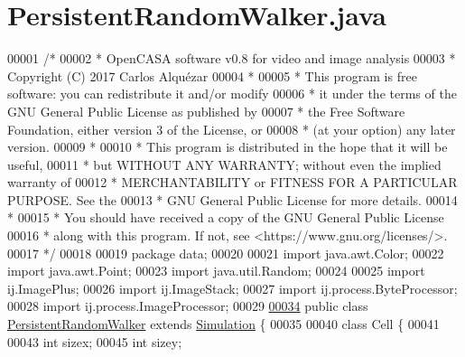\hypertarget{_persistent_random_walker_8java_source}{}\section{Persistent\+Random\+Walker.\+java}
\label{_persistent_random_walker_8java_source}

\begin{DoxyCode}
00001 \textcolor{comment}{/*}
00002 \textcolor{comment}{ *   OpenCASA software v0.8 for video and image analysis}
00003 \textcolor{comment}{ *   Copyright (C) 2017  Carlos Alquézar}
00004 \textcolor{comment}{ *}
00005 \textcolor{comment}{ *   This program is free software: you can redistribute it and/or modify}
00006 \textcolor{comment}{ *   it under the terms of the GNU General Public License as published by}
00007 \textcolor{comment}{ *   the Free Software Foundation, either version 3 of the License, or}
00008 \textcolor{comment}{ *   (at your option) any later version.}
00009 \textcolor{comment}{ *}
00010 \textcolor{comment}{ *   This program is distributed in the hope that it will be useful,}
00011 \textcolor{comment}{ *   but WITHOUT ANY WARRANTY; without even the implied warranty of}
00012 \textcolor{comment}{ *   MERCHANTABILITY or FITNESS FOR A PARTICULAR PURPOSE.  See the}
00013 \textcolor{comment}{ *   GNU General Public License for more details.}
00014 \textcolor{comment}{ *}
00015 \textcolor{comment}{ *   You should have received a copy of the GNU General Public License}
00016 \textcolor{comment}{ *   along with this program.  If not, see <https://www.gnu.org/licenses/>.}
00017 \textcolor{comment}{*/}    
00018 
00019 \textcolor{keyword}{package }data;
00020 
00021 \textcolor{keyword}{import} java.awt.Color;
00022 \textcolor{keyword}{import} java.awt.Point;
00023 \textcolor{keyword}{import} java.util.Random;
00024 
00025 \textcolor{keyword}{import} ij.ImagePlus;
00026 \textcolor{keyword}{import} ij.ImageStack;
00027 \textcolor{keyword}{import} ij.process.ByteProcessor;
00028 \textcolor{keyword}{import} ij.process.ImageProcessor;
00029 
\hypertarget{_persistent_random_walker_8java_source_l00034}{}\hyperlink{classdata_1_1_persistent_random_walker}{00034} \textcolor{keyword}{public} \textcolor{keyword}{class }\hyperlink{classdata_1_1_persistent_random_walker}{PersistentRandomWalker} \textcolor{keyword}{extends} \hyperlink{classdata_1_1_simulation}{Simulation} \{
00035 
00040   \textcolor{keyword}{class }Cell \{
00041 
00043     \textcolor{keywordtype}{int} sizex;
00045     \textcolor{keywordtype}{int} sizey;

\end{DoxyCode}
